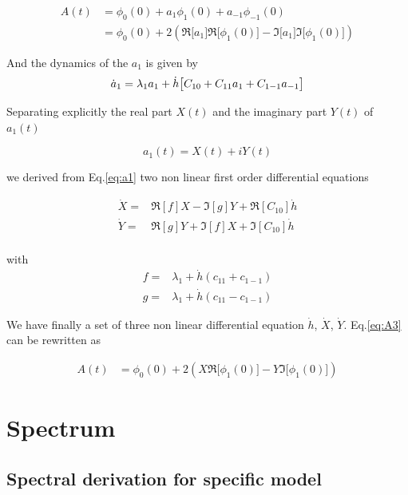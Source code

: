 \documentclass[12pt,twoside]{report}
\begin{document}
\begin{align}
\label{eq:A3}
A(t)&=\phi_0(0) + a_1\phi_1(0) +a_{-1}\phi_{-1}(0) \nonumber \\
&=\phi_0(0) + 2\left(\Re\big[a_1\big]\Re\big[\phi_1(0)\big]- \Im\big[a_1\big]\Im\big[\phi_1(0)\big]\right)
\end{align}


And the dynamics of the $a_1$ is given by
\begin{equation}
\label{eq:a1}
\dot{a}_1=\lambda_1 a_1 + \dot{h}\big[C_{10}+C_{11}a_1+C_{1-1}a_{-1}\big] \nonumber \\
\end{equation}

Separating explicitly the real part $X(t)$ and the imaginary part  $Y(t)$ of $a_1(t)$

\begin{equation}
\label{eq:a1xy}
a_1(t)= X(t) +i Y(t)
\end{equation}

we derived from Eq.\eqref{eq:a1}  two non linear first order differential equations

\begin{align}
\dot{X}=&\Re[f]X-\Im[g]Y +\Re[C_{10}]\dot{h}\\
\dot{Y}=&\Re[g]Y+\Im[f]X +\Im[C_{10}]\dot{h}\\
\end{align}

with
\begin{align}
f=&\lambda_1+ \dot{h}(c_{11}+c_{1-1})\\
g=&\lambda_1+ \dot{h}(c_{11}-c_{1-1})
\end{align}

We have finally a set of three non linear differential equation $\dot{h}$, $\dot{X}$, $\dot{Y}$. Eq.\eqref{eq:A3} can be rewritten as

\begin{align}
\label{eq:A4}
A(t)&=\phi_0(0) + 2\left(X\Re\big[\phi_1(0)\big]- Y\Im\big[\phi_1(0)\big]\right)
\end{align}


\chapter{Spectrum}
\label{chap:spectrum}
\section{Spectral derivation for specific model}
\label{sec:specif-model}
\end{document}
